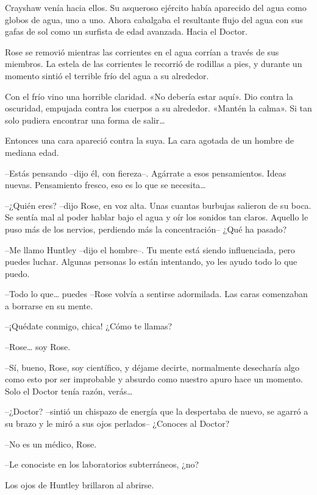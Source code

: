 {Crayshaw venía hacia ellos. Su asqueroso ejército había aparecido del
 agua como globos de agua, uno a uno. Ahora cabalgaba el resultante flujo
 del agua con sus gafas de sol como un surfista de edad avanzada. Hacia
el Doctor.}

\mbox{}

{Rose se removió mientras las corrientes en el agua corrían a través de
 sus miembros. La estela de las corrientes le recorrió de rodillas a
 pies, y durante un momento sintió el terrible frío del agua a su
alrededor.}

{Con el frío vino una horrible claridad. «No debería estar aquí». Dio
 contra la oscuridad, empujada contra los cuerpos a su alrededor. «Mantén
 la calma». Si tan solo pudiera encontrar una forma de salir\ldots{}}

{Entonces una cara apareció contra la suya. La cara agotada de un hombre
de mediana edad.}

{--Estás pensando --dijo él, con fiereza--. Agárrate a esos
 pensamientos. Ideas nuevas. Pensamiento fresco, eso es lo que se
 necesita\ldots{}}

{--¿Quién eres? --dijo Rose, en voz alta. Unas cuantas burbujas salieron
 de su boca. Se sentía mal al poder hablar bajo el agua y oír los sonidos
 tan claros. Aquello le puso más de los nervios, perdiendo más la
concentración-- ¿Qué ha pasado?}

{--Me llamo Huntley --dijo el hombre--. Tu mente está siendo
 influenciada, pero puedes luchar. Algunas personas lo están intentando,
yo les ayudo todo lo que puedo.}

{--Todo lo que\ldots{} puedes --Rose volvía a sentirse adormilada. Las
caras comenzaban a borrarse en su mente.}

{--¡Quédate conmigo, chica! ¿Cómo te llamas?}

{--Rose\ldots{} soy Rose.}

{--Sí, bueno, Rose, soy científico, y déjame decirte, normalmente
 desecharía algo como esto por ser improbable y absurdo como nuestro
 apuro hace un momento. Solo el Doctor tenía razón, verás\ldots{}}

{--¿Doctor? --sintió un chispazo de energía que la despertaba de nuevo,
 se agarró a su brazo y le miró a sus ojos perlados-- ¿Conoces al
Doctor?}

{--No es un médico, Rose.}

{--Le conociste en los laboratorios subterráneos, ¿no?}

{Los ojos de Huntley brillaron al abrirse.}

